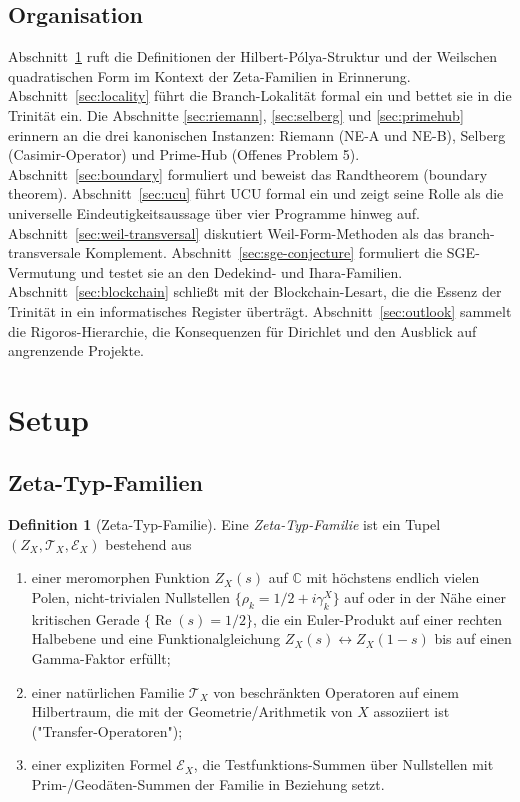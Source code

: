 \documentclass[11pt]{article}
\theoremstyle{definition}
\newtheorem{definition}[theorem]{Definition}
\theoremstyle{remark}
\renewcommand{\Re}{\operatorname{Re}}
\begin{document}
\subsection{Organisation}
\label{sec:intro-organization}

Abschnitt~\ref{sec:setup} ruft die Definitionen der Hilbert-P\'olya-Struktur und
der Weilschen quadratischen Form im Kontext der Zeta-Familien in Erinnerung.
Abschnitt~\ref{sec:locality} führt die Branch-Lokalität formal ein und bettet sie
in die Trinität ein. Die Abschnitte \ref{sec:riemann}, \ref{sec:selberg} und \ref{sec:primehub}
erinnern an die drei kanonischen Instanzen: Riemann (NE-A und NE-B), Selberg
(Casimir-Operator) und Prime-Hub (Offenes Problem 5).
Abschnitt~\ref{sec:boundary} formuliert und beweist das Randtheorem (boundary theorem).
Abschnitt~\ref{sec:ucu} führt UCU formal ein und zeigt seine
Rolle als die universelle Eindeutigkeitsaussage über vier Programme hinweg auf.
Abschnitt~\ref{sec:weil-transversal} diskutiert Weil-Form-Methoden als das
branch-transversale Komplement. Abschnitt~\ref{sec:sge-conjecture}
formuliert die SGE-Vermutung und testet sie an den Dedekind- und
Ihara-Familien. Abschnitt~\ref{sec:blockchain} schließt mit der
Blockchain-Lesart, die die Essenz der Trinität in ein informatisches Register
überträgt. Abschnitt~\ref{sec:outlook} sammelt die Rigoros-Hierarchie, die Konsequenzen
für Dirichlet und den Ausblick auf angrenzende Projekte.

\section{Setup}
\label{sec:setup}

\subsection{Zeta-Typ-Familien}
\label{sec:zeta-family}

\begin{definition}[Zeta-Typ-Familie]\label{def:zeta-family}
Eine \emph{Zeta-Typ-Familie} ist ein Tupel $(Z_X, \mathcal{T}_X, \mathcal{E}_X)$
bestehend aus
\begin{enumerate}
\item einer meromorphen Funktion $Z_X(s)$ auf $\mathbb{C}$ mit höchstens
  endlich vielen Polen, nicht-trivialen Nullstellen $\{\rho_k = 1/2 + i\gamma_k^X\}$
  auf oder in der Nähe einer kritischen Gerade $\{\Re(s) = 1/2\}$, die ein Euler-Produkt
  auf einer rechten Halbebene und eine Funktionalgleichung
  $Z_X(s) \leftrightarrow Z_X(1-s)$ bis auf einen Gamma-Faktor erfüllt;
\item einer natürlichen Familie $\mathcal{T}_X$ von beschränkten Operatoren auf einem
  Hilbertraum, die mit der Geometrie/Arithmetik von $X$ assoziiert ist
  ("Transfer-Operatoren");
\item einer expliziten Formel $\mathcal{E}_X$, die Testfunktions-Summen
  über Nullstellen mit Prim-/Geodäten-Summen der Familie in Beziehung setzt.
\end{enumerate}
\end{definition}
\end{document}
